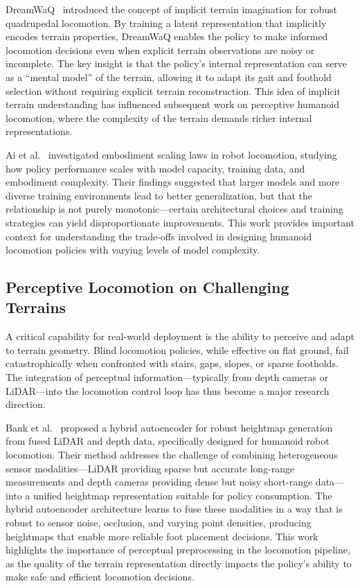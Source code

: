 DreamWaQ~\cite{nahraendra2024dreamwaq} introduced the concept of implicit terrain imagination for robust quadrupedal locomotion. By training a latent representation that implicitly encodes terrain properties, DreamWaQ enables the policy to make informed locomotion decisions even when explicit terrain observations are noisy or incomplete. The key insight is that the policy's internal representation can serve as a ``mental model'' of the terrain, allowing it to adapt its gait and foothold selection without requiring explicit terrain reconstruction. This idea of implicit terrain understanding has influenced subsequent work on perceptive humanoid locomotion, where the complexity of the terrain demands richer internal representations.

Ai et al.~\cite{ai2024embodimentscaling} investigated embodiment scaling laws in robot locomotion, studying how policy performance scales with model capacity, training data, and embodiment complexity. Their findings suggested that larger models and more diverse training environments lead to better generalization, but that the relationship is not purely monotonic---certain architectural choices and training strategies can yield disproportionate improvements. This work provides important context for understanding the trade-offs involved in designing humanoid locomotion policies with varying levels of model complexity.

\subsection{Perceptive Locomotion on Challenging Terrains}

A critical capability for real-world deployment is the ability to perceive and adapt to terrain geometry. Blind locomotion policies, while effective on flat ground, fail catastrophically when confronted with stairs, gaps, slopes, or sparse footholds. The integration of perceptual information---typically from depth cameras or LiDAR---into the locomotion control loop has thus become a major research direction.

Bank et al.~\cite{bank2024hybrid} proposed a hybrid autoencoder for robust heightmap generation from fused LiDAR and depth data, specifically designed for humanoid robot locomotion. Their method addresses the challenge of combining heterogeneous sensor modalities---LiDAR providing sparse but accurate long-range measurements and depth cameras providing dense but noisy short-range data---into a unified heightmap representation suitable for policy consumption. The hybrid autoencoder architecture learns to fuse these modalities in a way that is robust to sensor noise, occlusion, and varying point densities, producing heightmaps that enable more reliable foot placement decisions. This work highlights the importance of perceptual preprocessing in the locomotion pipeline, as the quality of the terrain representation directly impacts the policy's ability to make safe and efficient locomotion decisions.

